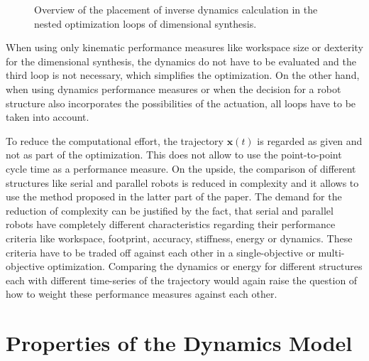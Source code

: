 \documentclass{svproc}
\newcommand{\bm}[1]{\boldsymbol{#1}}
\begin{document}
\begin{figure}[tb]
    
    \caption{Overview of the placement of inverse dynamics calculation in the nested optimization loops of dimensional synthesis.}
    \label{fig:dimsynth_dyn_std}
\end{figure} 

When using only kinematic performance measures like workspace size or dexterity for the dimensional synthesis, the dynamics do not have to be evaluated and the third loop is not necessary, which simplifies the optimization.
On the other hand, when using dynamics performance measures or when the decision for a robot structure also incorporates the possibilities of the actuation, all loops have to be taken into account.

To reduce the computational effort, the trajectory $\bm{x}(t)$ is regarded as given and not as part of the optimization.
This does not allow to use the point-to-point cycle time as a performance measure.
On the upside, the comparison of different structures like serial and parallel robots is reduced in complexity and it allows to use the method proposed in the latter part of the paper.
The demand for the reduction of complexity can be justified by the fact, that serial and parallel robots have completely different characteristics regarding their performance criteria like workspace, footprint, accuracy, stiffness, energy or dynamics.
These criteria have to be traded off against each other in a single-objective or multi-objective optimization.
Comparing the dynamics or energy for different structures each with different time-series of the trajectory would again raise the question of how to weight these performance measures against each other.


\section{Properties of the Dynamics Model}
\label{sec:DynMdl}
\end{document}
